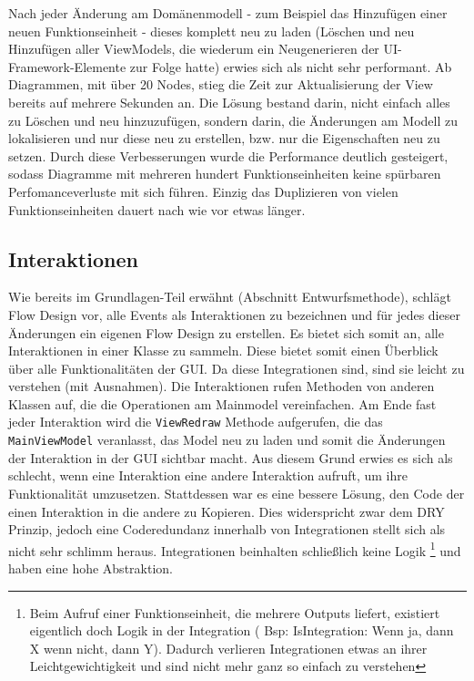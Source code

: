 Nach jeder Änderung am Domänenmodell - zum Beispiel das Hinzufügen einer neuen
Funktionseinheit -  dieses komplett neu zu laden (Löschen und neu Hinzufügen aller
ViewModels, die wiederum ein Neugenerieren der UI-Framework-Elemente zur
Folge hatte) erwies sich als nicht sehr performant. 
Ab Diagrammen, mit über 20 Nodes, stieg die Zeit zur Aktualisierung der View
bereits auf mehrere Sekunden an.
Die Lösung bestand darin, nicht einfach alles zu Löschen und neu
hinzuzufügen, sondern darin, die Änderungen am Modell zu lokalisieren und nur
diese neu zu erstellen, bzw. nur die Eigenschaften neu zu setzen. Durch
diese Verbesserungen wurde die Performance deutlich gesteigert, sodass
Diagramme mit mehreren hundert Funktionseinheiten keine spürbaren Perfomanceverluste mit
sich führen. Einzig das Duplizieren von vielen Funktionseinheiten dauert nach wie vor
etwas länger. 

\subsection{Interaktionen}

Wie bereits im Grundlagen-Teil erwähnt (Abschnitt Entwurfsmethode), schlägt Flow Design
vor, alle Events als Interaktionen zu bezeichnen und für jedes dieser
Änderungen ein eigenen Flow Design zu erstellen. 
Es bietet sich somit an, alle Interaktionen in einer Klasse zu sammeln.
Diese bietet somit einen Überblick über alle Funktionalitäten der GUI.
Da diese Integrationen sind, sind sie leicht zu verstehen (mit Ausnahmen). Die
Interaktionen rufen Methoden von anderen Klassen auf, die die Operationen am
Mainmodel vereinfachen. Am Ende fast jeder Interaktion wird die \texttt{ViewRedraw}
Methode aufgerufen, die das \texttt{MainViewModel} veranlasst, das Model neu zu
laden und somit die Änderungen der Interaktion in der GUI sichtbar macht.
Aus diesem Grund erwies es sich als schlecht, wenn eine Interaktion eine andere
Interaktion aufruft, um ihre Funktionalität umzusetzen. 
Stattdessen war es eine bessere Lösung, den Code der einen Interaktion in
die andere zu Kopieren. Dies widerspricht zwar dem DRY Prinzip, jedoch eine
Coderedundanz innerhalb von Integrationen stellt sich als nicht sehr schlimm
heraus. Integrationen beinhalten schließlich keine Logik \footnote{Beim
Aufruf einer Funktionseinheit, die mehrere Outputs liefert, existiert
eigentlich doch Logik in der Integration ( Bsp: IsIntegration: Wenn ja,
dann X wenn nicht, dann Y). Dadurch verlieren Integrationen etwas an ihrer
Leichtgewichtigkeit und sind nicht mehr ganz so einfach zu verstehen} und haben eine hohe
Abstraktion.

